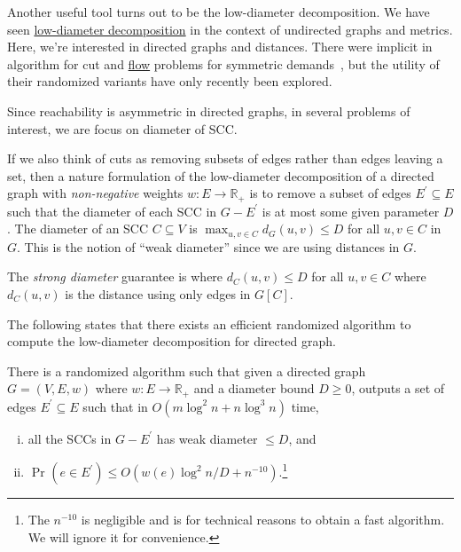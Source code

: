 Another useful tool turns out to be the low-diameter decomposition. We have seen \hyperref[def:low-diameter-decomposition]{low-diameter decomposition} in the context of undirected graphs and metrics. Here, we're interested in directed graphs and distances. There were implicit in algorithm for cut and \hyperref[def:flow]{flow} problems for symmetric demands~\cite{klein1997approximation,seymour1995packing,even2000divide}, but the utility of their randomized variants have only recently been explored.

\begin{intuition}
	Since reachability is asymmetric in directed graphs, in several problems of interest, we are focus on diameter of SCC.
\end{intuition}

If we also think of cuts as removing subsets of edges rather than edges leaving a set, then a nature formulation of the low-diameter decomposition of a directed graph with \emph{non-negative} weights \(w\colon E \to \mathbb{R} _{+}\) is to remove a subset of edges \(E^{\prime} \subseteq E\) such that the diameter of each SCC in \(G - E^{\prime} \) is at most some given parameter \(D\). The diameter of an SCC \(C \subseteq V\) is \(\max _{u, v \in C} d_G(u, v) \leq D\) for all \(u, v \in C\) in \(G\). This is the notion of ``weak diameter'' since we are using distances in \(G\).

\begin{notation}\label{not:strong-diameter}
	The \emph{strong diameter} guarantee is where \(d_C(u, v) \leq D\) for all \(u, v \in C\) where \(d_C(u, v)\) is the distance using only edges in \(G[C]\).
\end{notation}

The following states that there exists an efficient randomized algorithm to compute the low-diameter decomposition for directed graph.

\begin{theorem}\label{thm:directed-LDD}
	There is a randomized algorithm such that given a directed graph \(G = (V, E, w)\) where \(w \colon E \to \mathbb{R} _{+}\) and a diameter bound \(D \geq 0\), outputs a set of edges \(E^{\prime} \subseteq E\) such that in \(O(m \log ^2 n + n \log ^3 n)\) time,
	\begin{enumerate}[(i)]
		\item all the SCCs in \(G - E^{\prime} \) has weak diameter \(\leq D\), and
		\item \(\Pr_{}(e \in E^{\prime} ) \leq O(w(e) \log ^2 n / D + n^{-10})\).\footnote{The \(n^{-10}\) is negligible and is for technical reasons to obtain a fast algorithm. We will ignore it for convenience.}
	\end{enumerate}
\end{theorem}

